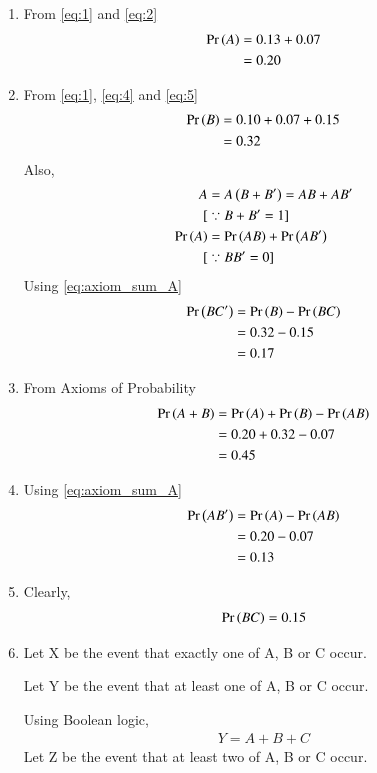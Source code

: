 \documentclass[journal,12pt,twocolumn]{IEEEtran}
\begin{document}
\begin{enumerate}[label=(\alph*)]
\item 
From \eqref{eq:1} and \eqref{eq:2}
\begin{align}
\Pr\left(A\right) &= 0.13 + 0.07\\
       &= 0.20
\end{align}
\item 
From \eqref{eq:1}, \eqref{eq:4} and \eqref{eq:5}
\begin{align}
\label{eq:3}
    \Pr\left(B\right) &= 0.10 + 0.07 + 0.15\\
       &= 0.32
\end{align}
Also,
\begin{align}
A &= A \left(B+B^{\prime}\right) =  AB + AB^{\prime}\\
[&\because B + B^\prime = 1]\\\label{eq:axiom_sum_A}
\Pr\left(A\right) &= \Pr\left(AB\right) +\Pr\left(AB^\prime\right)\\
    [&\because BB^\prime = 0] \nonumber
\end{align}
Using \eqref{eq:axiom_sum_A}
\begin{align}
    \Pr\left(BC^\prime\right) &= \Pr\left(B\right) - \Pr\left(BC\right) \\
    &= 0.32 - 0.15\\
    &= 0.17
\end{align}
\item 
From Axioms of Probability
\begin{align}
\label{Axioms}
    \Pr\left(A + B\right) &= \Pr\left(A\right) + \Pr\left(B\right) - \Pr\left(AB\right)\\
    &= 0.20 + 0.32 - 0.07\\
    &= 0.45
\end{align}
\item 
Using \eqref{eq:axiom_sum_A}
\begin{align}
    \Pr\left(AB^\prime\right) &= \Pr\left(A\right) - \Pr\left(AB\right) \\
    &= 0.20 - 0.07\\
    &= 0.13
\end{align}
\item 
Clearly,
\begin{align}
    \Pr\left(BC\right) = 0.15
\end{align}
\item 
Let X be the event that exactly one of A, B or C occur.

Let Y be the event that at least one of A, B or C occur.

Using Boolean logic,
\begin{align}
    Y=A+B+C
\end{align}
Let Z be the event that at least two of A, B or C occur.


\end{enumerate}
\end{document}
